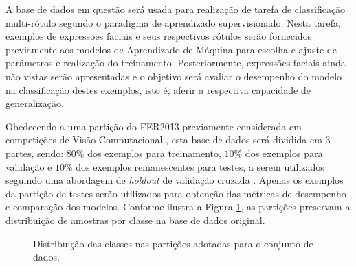 A base de dados em questão será usada para realização de tarefa de classificação multi-rótulo segundo o paradigma de aprendizado supervisionado. Nesta tarefa, exemplos de expressões faciais e seus respectivos rótulos serão fornecidos previamente aos modelos de Aprendizado de Máquina para escolha e ajuste de parâmetros e realização do treinamento. Posteriormente, expressões faciais ainda não vistas serão apresentadas e o objetivo será avaliar o desempenho do modelo na classificação destes exemplos, isto é, aferir a respectiva capacidade de generalização.

Obedecendo a uma partição do FER2013 previamente considerada em competições de Visão Computacional \cite{Kaggle:FER2013}, esta base de dados será dividida em $3$ partes, sendo: $80\%$ dos exemplos para treinamento,  $10\%$ dos exemplos para validação e $10\%$ dos exemplos remanescentes para testes, a serem utilizados seguindo uma abordagem de \emph{holdout} de validação cruzada  \cite{Brink:MachineLearningLivro}.  Apenas os exemplos da partição de testes serão utilizados para obtenção das métricas de desempenho e comparação dos modelos. Conforme ilustra a Figura \ref{fig:particoes}, as partições preservam a distribuição de amostras por classe na base de dados original.

\begin{figure}[h!]
	\centering
  	\caption{Distribuição das classes nas partições adotadas para o conjunto de dados.} \label{fig:particoes}
\end{figure}

